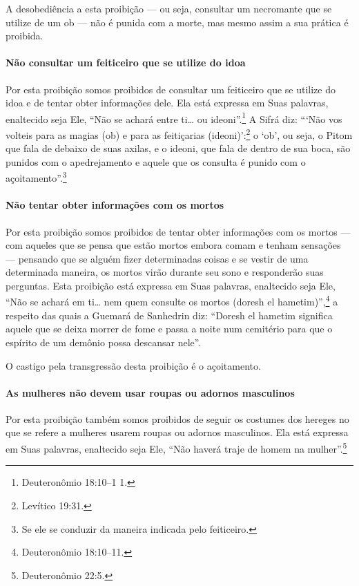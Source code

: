 \begin{multicols}{2}
A desobediência a esta proibição --- ou seja, consultar um necromante
que se utilize de um ob\starr{} --- não é punida com a morte, mas mesmo
assim a sua prática é proibida.

\paragraph{Não consultar um feiticeiro que se utilize do idoa\starr}

Por esta proibição somos proibidos de consultar um feiticeiro que se
utilize do idoa\starr{} e de tentar obter informações dele. Ela está
expressa em Suas palavras, enaltecido seja Ele, ``Não se achará entre
ti\ldots{} ou ideoni\starr''.\footnote{Deuteronômio 18:10--1 1.} A Sifrá\starr{} diz: ```Não vos
volteis para as magias (ob) e para as feitiçarias (ideoni\starr)':\footnote{Levítico
19:31.} o `ob', ou seja, o Pitom\starr{} que fala de debaixo de suas axilas, e o
ideoni\starr, que fala de dentro de sua boca, são punidos com o
apedrejamento e aquele que os consulta é punido com o
açoitamento''.\footnote{Se ele se conduzir da maneira indicada pelo feiticeiro.}

\paragraph{Não tentar obter informações com os mortos}

Por esta proibição somos proibidos de tentar obter informações com os
mortos --- com aqueles que se pensa que estão mortos embora comam e
tenham sensações --- pensando que se alguém fizer determinadas coisas e
se vestir de uma determinada maneira, os mortos virão durante seu sono e
responderão suas perguntas. Esta proibição está expressa em Suas
palavras, enaltecido seja Ele, ``Não se achará em ti\ldots{} nem quem
consulte os mortos (doresh el hametim\starr)'',\footnote{Deuteronômio 18:10--11.} a
respeito das quais a Guemará\starr{} de Sanhedrin\starr{} diz: ``Doresh el hametim\starr{}
significa aquele que se deixa morrer de fome e passa a noite num
cemitério para que o espírito de um demônio possa descansar nele''.

O castigo pela transgressão desta proibição é o açoitamento.

\paragraph{As mulheres não devem usar roupas ou adornos masculinos}

Por esta proibição também somos proibidos de seguir os costumes dos
hereges no que se refere a mulheres usarem roupas ou adornos masculinos.
Ela está expressa em Suas palavras, enaltecido seja Ele, ``Não haverá
traje de homem na mulher''.\footnote{Deuteronômio 22:5.}


\end{multicols}
